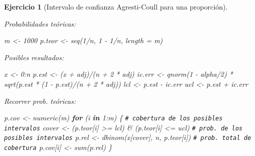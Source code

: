 \documentclass[
]{book}
\newenvironment{Shaded}{\begin{snugshade}}{\end{snugshade}}
\newcommand{\AttributeTok}[1]{\textcolor[rgb]{0.77,0.63,0.00}{#1}}
\newcommand{\CommentTok}[1]{\textcolor[rgb]{0.56,0.35,0.01}{\textit{#1}}}
\newcommand{\ControlFlowTok}[1]{\textcolor[rgb]{0.13,0.29,0.53}{\textbf{#1}}}
\newcommand{\DecValTok}[1]{\textcolor[rgb]{0.00,0.00,0.81}{#1}}
\newcommand{\FunctionTok}[1]{\textcolor[rgb]{0.00,0.00,0.00}{#1}}
\newcommand{\NormalTok}[1]{#1}
\newcommand{\OtherTok}[1]{\textcolor[rgb]{0.56,0.35,0.01}{#1}}
\newcommand{\SpecialCharTok}[1]{\textcolor[rgb]{0.00,0.00,0.00}{#1}}
\theoremstyle{break}
\newtheorem{exercise}{Ejercicio}[chapter]
\theoremstyle{nonumberplain}
\renewcommand{\CommentTok}[1]{\textcolor[rgb]{0.41,0.41,0.41}{\texttt{#1}}}
\begin{document}
\begin{exercise}[Intervalo de confianza Agresti-Coull para una proporción]
\begin{enumerate}
  Probabilidades teóricas:

\begin{Shaded}
\begin{Highlighting}[]
\NormalTok{m }\OtherTok{\textless{}{-}} \DecValTok{1000}
\NormalTok{p.teor }\OtherTok{\textless{}{-}} \FunctionTok{seq}\NormalTok{(}\DecValTok{1}\SpecialCharTok{/}\NormalTok{n, }\DecValTok{1} \SpecialCharTok{{-}} \DecValTok{1}\SpecialCharTok{/}\NormalTok{n, }\AttributeTok{length =}\NormalTok{ m) }
\end{Highlighting}
\end{Shaded}

  Posibles resultados:

\begin{Shaded}
\begin{Highlighting}[]
\NormalTok{x }\OtherTok{\textless{}{-}} \DecValTok{0}\SpecialCharTok{:}\NormalTok{n}
\NormalTok{p.est }\OtherTok{\textless{}{-}}\NormalTok{ (x }\SpecialCharTok{+}\NormalTok{ adj)}\SpecialCharTok{/}\NormalTok{(n }\SpecialCharTok{+} \DecValTok{2} \SpecialCharTok{*}\NormalTok{ adj) }
\NormalTok{ic.err }\OtherTok{\textless{}{-}} \FunctionTok{qnorm}\NormalTok{(}\DecValTok{1} \SpecialCharTok{{-}}\NormalTok{ alpha}\SpecialCharTok{/}\DecValTok{2}\NormalTok{) }\SpecialCharTok{*} \FunctionTok{sqrt}\NormalTok{(p.est }\SpecialCharTok{*}\NormalTok{ (}\DecValTok{1} \SpecialCharTok{{-}}\NormalTok{ p.est)}\SpecialCharTok{/}\NormalTok{(n }\SpecialCharTok{+} \DecValTok{2} \SpecialCharTok{*}\NormalTok{ adj))  }
\NormalTok{lcl }\OtherTok{\textless{}{-}}\NormalTok{ p.est }\SpecialCharTok{{-}}\NormalTok{ ic.err }
\NormalTok{ucl }\OtherTok{\textless{}{-}}\NormalTok{ p.est }\SpecialCharTok{+}\NormalTok{ ic.err }
\end{Highlighting}
\end{Shaded}

  Recorrer prob. teóricas:

\begin{Shaded}
\begin{Highlighting}[]
\NormalTok{p.cov }\OtherTok{\textless{}{-}} \FunctionTok{numeric}\NormalTok{(m)}
\ControlFlowTok{for}\NormalTok{ (i }\ControlFlowTok{in} \DecValTok{1}\SpecialCharTok{:}\NormalTok{m) \{}
  \CommentTok{\# cobertura de los posibles intervalos}
\NormalTok{  cover }\OtherTok{\textless{}{-}}\NormalTok{ (p.teor[i] }\SpecialCharTok{\textgreater{}=}\NormalTok{ lcl) }\SpecialCharTok{\&}\NormalTok{ (p.teor[i] }\SpecialCharTok{\textless{}=}\NormalTok{ ucl)  }
  \CommentTok{\# prob. de los posibles intervalos}
\NormalTok{  p.rel }\OtherTok{\textless{}{-}} \FunctionTok{dbinom}\NormalTok{(x[cover], n, p.teor[i])           }
  \CommentTok{\# prob. total de cobertura}
\NormalTok{  p.cov[i] }\OtherTok{\textless{}{-}} \FunctionTok{sum}\NormalTok{(p.rel)                            }
\NormalTok{\}}
\end{Highlighting}
\end{Shaded}


\end{enumerate}
\end{exercise}
\end{document}
